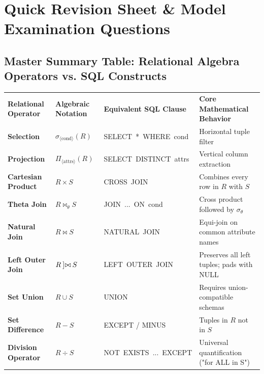 \documentclass[11pt,a4paper]{article}
\newcommand{\ic}[1]{\mbox{\colorbox{AnthCodeBG}{\footnotesize\ttfamily\textcolor{AnthBlue}{#1}}}}
\newcommand{\LeftJoin}{\mathbin{]\mkern-4mu\bowtie}}
\begin{document}
\clearpage
\section{Quick Revision Sheet \& Model Examination Questions}

\subsection{Master Summary Table: Relational Algebra Operators vs. SQL Constructs}

\begin{center}
\small
\begin{tabularx}{\textwidth}{L{2.8cm} L{3.5cm} L{3.5cm} X}
  \color{white}\textbf{Relational Operator} & \color{white}\textbf{Algebraic Notation} & \color{white}\textbf{Equivalent SQL Clause} & \color{white}\textbf{Core Mathematical Behavior} \\
   \textbf{Selection} & $\sigma_{\langle \text{cond} \rangle}(R)$ & \ic{SELECT * WHERE cond} & Horizontal tuple filter \\
  \textbf{Projection} & $\Pi_{\langle \text{attrs} \rangle}(R)$ & \ic{SELECT DISTINCT attrs} & Vertical column extraction \\
   \textbf{Cartesian Product} & $R \times S$ & \ic{CROSS JOIN} & Combines every row in $R$ with $S$ \\
  \textbf{Theta Join} & $R \bowtie_\theta S$ & \ic{JOIN ... ON cond} & Cross product followed by $\sigma_\theta$ \\
   \textbf{Natural Join} & $R \bowtie S$ & \ic{NATURAL JOIN} & Equi-join on common attribute names \\
  \textbf{Left Outer Join} & $R \LeftJoin S$ & \ic{LEFT OUTER JOIN} & Preserves all left tuples; pads with NULL \\
   \textbf{Set Union} & $R \cup S$ & \ic{UNION} & Requires union-compatible schemas \\
  \textbf{Set Difference} & $R - S$ & \ic{EXCEPT} / \ic{MINUS} & Tuples in $R$ not in $S$ \\
   \textbf{Division Operator} & $R \div S$ & \ic{NOT EXISTS ... EXCEPT} & Universal quantification ("for ALL in S") \\
\end{tabularx}
\end{center}
\end{document}

